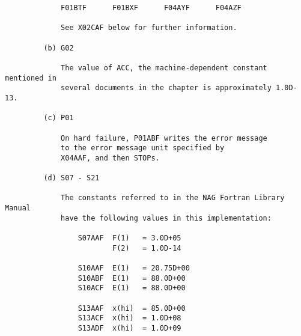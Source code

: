 \begin{small}
\begin{verbatim}
             F01BTF      F01BXF      F04AYF      F04AZF                         
                                                                                
             See X02CAF below for further information.                          
                                                                                
         (b) G02                                                                
                                                                                
             The value of ACC, the machine-dependent constant mentioned in      
             several documents in the chapter is approximately 1.0D-13.         
                                                                                
         (c) P01                                                                
                                                                                
             On hard failure, P01ABF writes the error message                   
             to the error message unit specified by                             
             X04AAF, and then STOPs.                                            
                                                                                
         (d) S07 - S21                                                          
                                                                                
             The constants referred to in the NAG Fortran Library Manual        
             have the following values in this implementation:                  
                                                                                
                 S07AAF  F(1)   = 3.0D+05                                       
                         F(2)   = 1.0D-14                                       
                                                                                
                 S10AAF  E(1)   = 20.75D+00                                     
                 S10ABF  E(1)   = 88.0D+00                                      
                 S10ACF  E(1)   = 88.0D+00                                      
                                                                                
                 S13AAF  x(hi)  = 85.0D+00                                      
                 S13ACF  x(hi)  = 1.0D+08                                       
                 S13ADF  x(hi)  = 1.0D+09                                       
                                                                                

\end{verbatim}
\end{small}
